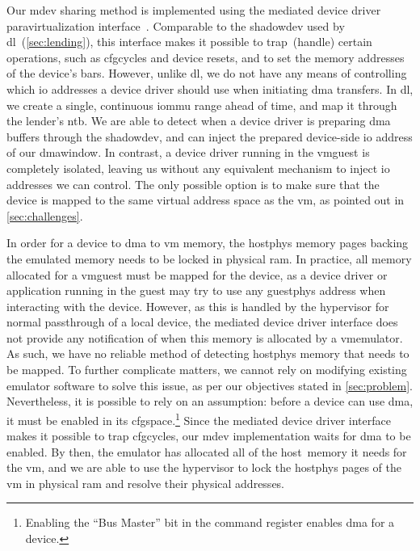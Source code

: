 Our \gls{mdev} sharing method is implemented using the mediated device driver \gls{paravirtualization} interface~\cite{url:LinuxMDEV}.
%
Comparable to the \gls{shadowdev} used by \gls{dl}~(\cref{sec:lending}), this interface makes it possible to \gls{trap}~(handle) certain operations, such as \glspl{cfgcycle} and device resets, and to set the memory addresses of the device's \glspl{bar}.
%
However, unlike \gls{dl}, we do not have any means of controlling which \gls{io} addresses a device driver should use when initiating \gls{dma} transfers.
%
In \gls{dl}, we create a single, continuous \gls{iommu} range ahead of time, and map it through the \gls{lender}'s \gls{ntb}. 
%
We are able to detect when a device driver is preparing \gls{dma} buffers through the \gls{shadowdev}, and can inject the prepared device-side \gls{io} address of our \gls{dmawindow}.
%
In contrast, a device driver running in the \gls{vmguest} is completely isolated, leaving us without any equivalent mechanism to inject \gls{io} addresses we can control.
%
The only possible option is to make sure that the device is mapped to the same virtual address space as the \gls{vm}, as pointed out in \cref{sec:challenges}.



In order for a device to \gls{dma} to \gls{vm} memory, the \gls{hostphys} memory pages backing the emulated memory needs to be locked in physical \gls{ram}.
%
In practice, all memory allocated for a \gls{vmguest} must be mapped for the device, as a device driver or application running in the \gls{guest} may try to use any \gls{guestphys} address when interacting with the device.
%
However, as this is handled by the \gls{hypervisor} for normal \gls{passthrough} of a local device, the mediated device driver interface does not provide any notification of when this memory is allocated by a \gls{vmemulator}.
%
As such, we have no reliable method of detecting \gls{hostphys} memory that needs to be mapped. %
%
To further complicate matters, we cannot rely on modifying existing \gls{emulator} software to solve this issue, as per our objectives stated in \cref{sec:problem}.
%
Nevertheless, it is possible to rely on an assumption:
%
before a device can use \gls{dma}, it must be enabled in its \gls{cfgspace}.\footnote{Enabling the ``Bus Master'' bit in the command register enables \gls{dma} for a device.}
%
Since the mediated device driver interface makes it possible to \gls{trap} \glspl{cfgcycle}, our \gls{mdev} implementation waits for \gls{dma} to be enabled.
%
By then, the \gls{emulator} has allocated all of the \gls{host}~memory it needs for the \gls{vm}, and we are able to use the \gls{hypervisor} to lock the \gls{hostphys} pages of the \gls{vm} in physical \gls{ram} and resolve their physical addresses.



